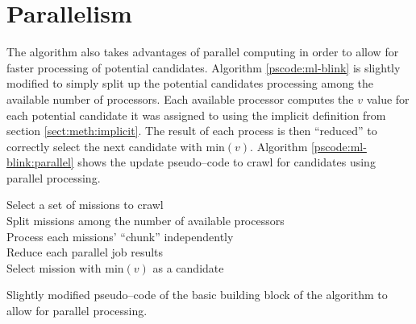 \section{Parallelism} \label{sect:meth:parallelism}

The \mlblink algorithm also takes advantages of parallel computing in order to allow for faster processing of potential candidates. Algorithm \ref{pscode:ml-blink} is slightly modified to simply split up the potential candidates processing among the available number of processors. Each available processor computes the $v$ value for each potential candidate it was assigned to using the implicit definition from section \ref{sect:meth:implicit}. The result of each process is then ``reduced'' to correctly select the next candidate with $\text{min}(v)$. Algorithm \ref{pscode:ml-blink:parallel} shows the update pseudo--code to crawl for candidates using parallel processing.

\vspace{0.4cm}
\begin{algorithm}[H]
    \SetAlgoLined
        \FMain{} {
             {
                Select a set of missions to crawl \\
                Split missions among the number of available processors \\
                Process each missions' ``chunk'' independently \\
                Reduce each parallel job results \\
                Select mission with $\text{min}(v)$ as a candidate \\
            }
        }
    \caption{Slightly modified pseudo--code of the basic building block of the \mlblink algorithm to allow for parallel processing.}
    \label{pscode:ml-blink:parallel}
\end{algorithm}
\vspace{0.4cm}